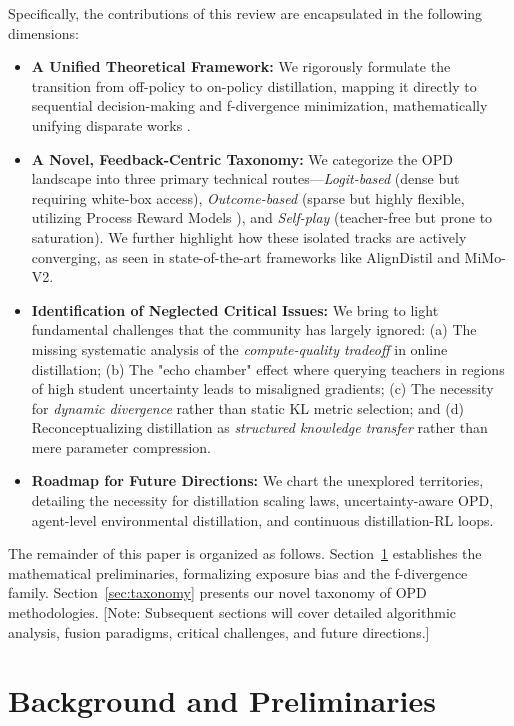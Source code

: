 \documentclass{article}
\begin{document}
Specifically, the contributions of this review are encapsulated in the following dimensions:
\begin{itemize}[leftmargin=*]
    \item \textbf{A Unified Theoretical Framework:} We rigorously formulate the transition from off-policy to on-policy distillation, mapping it directly to sequential decision-making and f-divergence minimization, mathematically unifying disparate works \citep{2306.13649, 2306.08543, 2402.03898}.
    \item \textbf{A Novel, Feedback-Centric Taxonomy:} We categorize the OPD landscape into three primary technical routes—\textit{Logit-based} (dense but requiring white-box access), \textit{Outcome-based} (sparse but highly flexible, utilizing Process Reward Models \citep{2305.20050}), and \textit{Self-play} (teacher-free but prone to saturation). We further highlight how these isolated tracks are actively converging, as seen in state-of-the-art frameworks like AlignDistil \citep{2503.02832} and MiMo-V2.
    \item \textbf{Identification of Neglected Critical Issues:} We bring to light fundamental challenges that the community has largely ignored: (a) The missing systematic analysis of the \textit{compute-quality tradeoff} in online distillation; (b) The "echo chamber" effect where querying teachers in regions of high student uncertainty leads to misaligned gradients; (c) The necessity for \textit{dynamic divergence} rather than static KL metric selection; and (d) Reconceptualizing distillation as \textit{structured knowledge transfer} rather than mere parameter compression.
    \item \textbf{Roadmap for Future Directions:} We chart the unexplored territories, detailing the necessity for distillation scaling laws, uncertainty-aware OPD, agent-level environmental distillation, and continuous distillation-RL loops.
\end{itemize}

The remainder of this paper is organized as follows. Section~\ref{sec:background} establishes the mathematical preliminaries, formalizing exposure bias and the f-divergence family. Section~\ref{sec:taxonomy} presents our novel taxonomy of OPD methodologies. [Note: Subsequent sections will cover detailed algorithmic analysis, fusion paradigms, critical challenges, and future directions.]


\section{Background and Preliminaries}
\label{sec:background}
\end{document}

